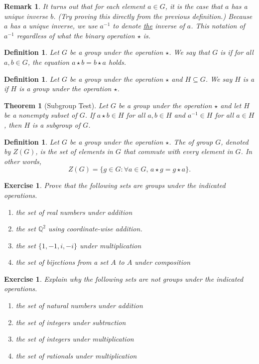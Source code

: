 \documentclass{book}
\newcounter{ekcounter}%
\theoremstyle{ekimcustom}
\newtheorem{theorem}[ekcounter]{Theorem}
\newtheorem{exercise}[ekcounter]{Exercise}
\newtheorem{remark}[ekcounter]{Remark}
\newtheorem{definition}[ekcounter]{Definition}
\newcommand\defn[1]{{\color{blue}{\bf #1}}}
\begin{document}
\begin{remark}
It turns out that for each element $a \in G$, it is the case that $a$ has a \emph{unique} inverse $b$. (Try proving this directly from the previous definition.) Because $a$ has a unique inverse, we use $a^{-1}$ to denote \underline{the} inverse of $a$. This notation of $a^{-1}$ regardless of what the binary operation $\star$ is.
\end{remark}

\begin{definition}
Let $G$ be a group under the operation $\star$. We say that $G$ is \defn{abelian} if for all $a, b \in G$, the equation $a \star b = b \star a$ holds.
\end{definition}

\begin{definition}
Let $G$ be a group under the operation $\star$ and $H \subseteq G$.  We say $H$ is a \defn{subgroup of $G$} if $H$ is a group under the operation $\star$.
\end{definition}

\begin{theorem}[Subgroup Test]
Let $G$ be a group under the operation $\star$ and let $H$ be a nonempty subset of $G$.  If $a\star b \in H$ for all $a,b \in H$ and $a^{-1} \in H$ for all $a \in H$, then $H$ is a subgroup of $G$.
\end{theorem}

\begin{definition}
Let $G$ be a group under the operation $\star$.  The \defn{center} of group $G$, denoted by $Z(G)$, is the set of elements in $G$ that commute with every element in $G$. In other words,
\[Z(G) = \{g \in G : \forall a \in G,\, a \star g = g \star a\}.\]
\end{definition}

\begin{exercise}
Prove that the following sets are groups under the indicated operations.
\begin{enumerate}
\item the set of real numbers under addition
\item the set $\mathbb{Q}^2$ using coordinate-wise addition.
\item the set $\{1,-1,i,-i\}$ under multiplication
\item the set of bijections from a set $A$ to $A$ under composition
\end{enumerate}
\end{exercise}

\begin{exercise}
Explain why the following sets are not groups under the indicated operations.
\begin{enumerate}
\item the set of natural numbers under addition
\item the set of integers under subtraction
\item the set of integers under multiplication
\item the set of rationals under multiplication
\end{enumerate}
\end{exercise}
\end{document}
